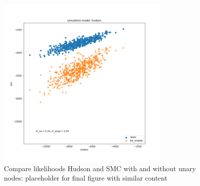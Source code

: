 \documentclass{article}
\begin{document}
\begin{figure}[!ht]
\centering
\includegraphics[width=0.75\textwidth]{figures/supplementary-figs/v_hudson_unary_simpl.png}
\caption{Compare likelihoods Hudson and SMC with and without unary nodes: placeholder for final figure with similar content}
\label{sup:fig:vs-hudson}
\end{figure}
\end{document}
